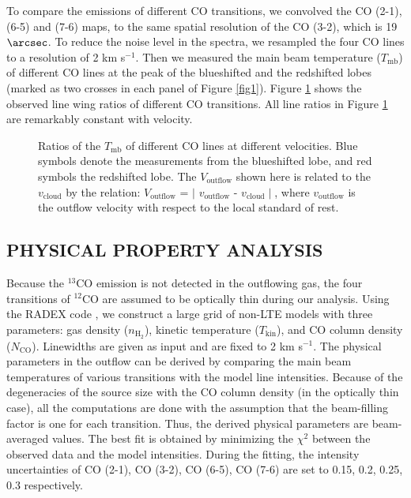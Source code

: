 To compare the emissions of different CO transitions, we convolved the CO (2-1), (6-5) and (7-6) maps, to the same spatial resolution of the CO (3-2), which is 19${\arcsec}$. To reduce the noise level in the spectra, we resampled the four CO lines to a resolution of 2 km s$^{-1}$. Then we measured the main beam temperature ($T_{\mathrm{mb}}$) of different CO lines at the peak of the blueshifted and the redshifted lobes (marked as two crosses in each panel of Figure \ref{fig1}). Figure \ref{fig2} shows the observed line wing ratios of different CO transitions.  All line ratios in Figure \ref{fig2} are remarkably constant with velocity.

\begin{figure}[tbp]
\caption{Ratios of the $T_{\mathrm{mb}}$ of different CO lines at different velocities. Blue symbols denote the measurements from the blueshifted lobe, and red symbols the redshifted lobe. The $V_{\mathrm{outflow}}$ shown here is related to the $v_{\mathrm{cloud}}$ by the relation: $V_{\mathrm{outflow}}$ = $\mid$ $v_{\mathrm{outflow}}$ - $v_{\mathrm{cloud}}\mid$, where $v_{\mathrm{outflow}}$ is the outflow velocity with respect to the local standard of rest. \label{fig2}}
\end{figure}

\subsection{PHYSICAL PROPERTY ANALYSIS}
Because the $^{13}$CO emission is not detected in the outflowing gas, the four transitions of $^{12}$CO are assumed to be optically thin during our analysis. Using the RADEX code \citep{2007A&A...468..627V}, we construct a large grid of non-LTE models with three parameters: gas density ($n_{\mathrm{H}_2}$), kinetic temperature ($T_{\mathrm{kin}}$), and CO column density ($N_{\mathrm{CO}}$). Linewidths are given as input and are fixed to 2 km s$^{-1}$. The physical parameters in the outflow can be derived by comparing the main beam temperatures of various transitions with the model line intensities. Because of the degeneracies of the source size with the CO column density (in the optically thin case), all the computations are done with the assumption that the beam-filling factor is one for each transition. Thus, the derived physical parameters are beam-averaged values. The best fit is obtained by minimizing the $\chi^2$ between the observed data and the model intensities. During the fitting, the intensity uncertainties of CO (2-1), CO (3-2), CO (6-5), CO (7-6) are set to 0.15, 0.2, 0.25, 0.3 respectively.

